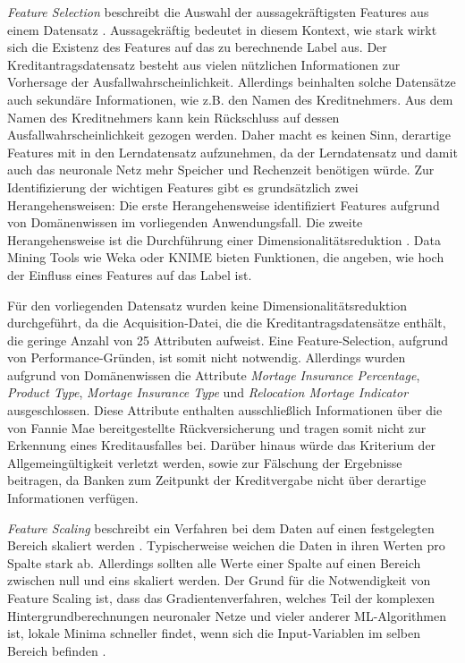 \begin{definition}
\begin{shaded}
\emph{Feature Selection} beschreibt die Auswahl der aussagekräftigsten Features aus einem Datensatz \cite[vgl. S. 503 ff.]{SG17}. Aussagekräftig bedeutet in diesem Kontext, wie stark wirkt sich die Existenz des Features auf das zu berechnende Label aus. Der Kreditantragsdatensatz besteht aus vielen nützlichen Informationen zur Vorhersage der Ausfallwahrscheinlichkeit. Allerdings beinhalten solche Datensätze auch sekundäre Informationen, wie z.B. den Namen des Kreditnehmers. Aus dem Namen des Kreditnehmers kann kein Rückschluss auf dessen Ausfallwahrscheinlichkeit gezogen werden.   Daher macht es keinen Sinn, derartige Features mit in den Lerndatensatz aufzunehmen, da der Lerndatensatz und damit auch das neuronale Netz mehr Speicher und Rechenzeit benötigen würde. Zur Identifizierung der wichtigen Features gibt es grundsätzlich zwei Herangehensweisen: Die erste Herangehensweise identifiziert Features aufgrund von Domänenwissen im vorliegenden Anwendungsfall. Die zweite Herangehensweise ist die Durchführung einer Dimensionalitätsreduktion \cite[vgl. S. 326]{SG17}. Data Mining Tools wie Weka \cite{WEKA17} oder KNIME \cite{KNIME17} bieten Funktionen, die angeben, wie hoch der Einfluss eines Features auf das Label ist. 
\label{def:selection}
\end{shaded}
\end{definition}

Für den vorliegenden Datensatz wurden keine Dimensionalitätsreduktion durchgeführt, da die Acquisition-Datei, die die Kreditantragsdatensätze enthält, die geringe Anzahl von 25 Attributen aufweist. Eine Feature-Selection, aufgrund von Performance-Gründen, ist somit nicht notwendig. Allerdings wurden aufgrund von Domänenwissen die Attribute \emph{Mortage Insurance Percentage}, \emph{Product Type}, \emph{Mortage Insurance Type} und \emph{Relocation Mortage Indicator} ausgeschlossen. Diese Attribute enthalten ausschließlich Informationen über die von Fannie Mae bereitgestellte Rückversicherung und tragen somit nicht zur Erkennung eines Kreditausfalles bei. Darüber hinaus würde das Kriterium der Allgemeingültigkeit verletzt werden, sowie zur Fälschung der Ergebnisse beitragen, da Banken zum Zeitpunkt der Kreditvergabe nicht über derartige Informationen verfügen.    

\begin{definition}
\begin{shaded}
\emph{Feature Scaling} beschreibt ein Verfahren bei dem Daten auf einen festgelegten Bereich skaliert werden \cite[vgl. S. 322]{SG17}. Typischerweise weichen die Daten in ihren Werten pro Spalte stark ab. Allerdings sollten alle Werte einer Spalte auf einen Bereich zwischen null und eins skaliert werden. Der Grund für die Notwendigkeit von Feature Scaling ist, dass das Gradientenverfahren, welches Teil der komplexen Hintergrundberechnungen neuronaler Netze und vieler anderer ML-Algorithmen ist, lokale Minima schneller findet, wenn sich die Input-Variablen im selben Bereich befinden \cite[vgl. S. 203]{CG15}. 
\label{def:scaling}
\end{shaded}
\end{definition}

